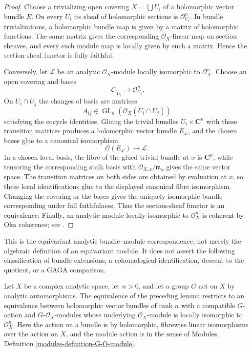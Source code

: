 \begin{proof}
Choose a trivializing open covering $X=\bigcup U_i$ of a holomorphic vector
bundle $E$. On every $U_i$ its sheaf of holomorphic sections is
$\mathcal O_{U_i}^n$. In bundle trivializations, a holomorphic bundle map is
given by a matrix of holomorphic functions. The same matrix gives the
corresponding $\mathcal O_X$-linear map on section sheaves, and every such
module map is locally given by such a matrix. Hence the section-sheaf
functor is fully faithful.

Conversely, let $\mathcal L$ be an analytic $\mathcal O_X$-module locally
isomorphic to $\mathcal O_X^n$. Choose an open covering and bases
$$
\mathcal L|_{U_i}\longrightarrow\mathcal O_{U_i}^n.
$$
On $U_i\cap U_j$ the changes of basis are matrices
$$
A_{ij}\in\operatorname{GL}_n(\mathcal O_X(U_i\cap U_j))
$$
satisfying the cocycle identities. Gluing the trivial bundles
$U_i\times\mathbf C^n$ with these transition matrices produces a
holomorphic vector bundle $E_{\mathcal L}$, and the chosen bases glue to a
canonical isomorphism
$$
\mathcal O(E_{\mathcal L})\longrightarrow\mathcal L.
$$
In a chosen local basis, the fibre of the glued trivial bundle at $x$ is
$\mathbf C^n$, while tensoring the corresponding stalk basis with
$\mathcal O_{X,x}/\mathfrak m_x$ gives the same vector space. The
transition matrices on both sides are obtained by evaluation at $x$, so
these local identifications glue to the displayed canonical fibre
isomorphism.
Changing the covering or the bases gives the uniquely isomorphic bundle
corresponding under full faithfulness. Thus the section-sheaf functor is an
equivalence. Finally, an analytic module locally isomorphic to
$\mathcal O_X^n$ is coherent by Oka coherence; see
\cite[p. 16]{Grauert-direct-image}.
\end{proof}

\begin{lemma}
\label{lemma-equivariant-holomorphic-vector-bundles-locally-free-modules}
\begin{reference}
\cite[Chapter V, \S 5.6, p. 219]{Tohoku}
\end{reference}
\begin{history}
This is the equivariant analytic bundle--module correspondence, not merely
the algebraic definition of an equivariant module. It does not assert the
following classification of bundle extensions, a cohomological
identification, descent to the quotient, or a GAGA comparison.
\end{history}
Let $X$ be a complex analytic space, let $n>0$, and let a group $G$ act on
$X$ by analytic automorphisms. The equivalence of the preceding lemma
restricts to an equivalence between holomorphic vector bundles of rank $n$
with a compatible $G$-action and $G$-$\mathcal O_X$-modules whose underlying
$\mathcal O_X$-module is locally isomorphic to $\mathcal O_X^n$.
Here the action on a bundle is by holomorphic, fibrewise linear
isomorphisms over the action on $X$, and the module action is in the sense
of Modules, Definition \ref{modules-definition-G-O-module}.
\end{lemma}

